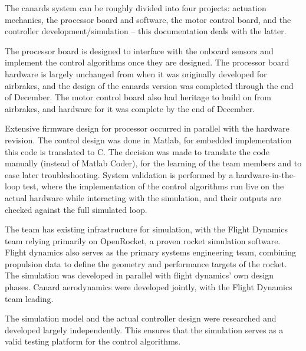 The canards system can be roughly divided into four projects: actuation mechanics, the processor board and software, the motor control board, and the controller development/simulation -- this documentation deals with the latter.

The processor board is designed to interface with the onboard sensors and implement the control algorithms once they are designed.
The processor board hardware is largely unchanged from when it was originally developed for airbrakes, and the design of the canards version was completed through the end of December. The motor control board also had heritage to build on from airbrakes, and hardware for it was complete by the end of December.

Extensive firmware design for processor occurred in parallel with the hardware revision. 
The control design was done in Matlab, for embedded implementation this code is translated to C.
The decision was made to translate the code manually (instead of Matlab Coder), for the learning of the team members and to ease later troubleshooting.
System validation is performed by a hardware-in-the-loop test, where the implementation of the control algorithms run live on the actual hardware while interacting with the simulation, and their outputs are checked against the full simulated loop.

The team has existing infrastructure for simulation, with the Flight Dynamics team relying primarily on OpenRocket, a proven rocket simulation software. 
Flight dynamics also serves as the primary systems engineering team, combining propulsion data to define the geometry and performance targets of the rocket. 
The simulation was developed in parallel with flight dynamics' own design phases.
Canard aerodynamics were developed jointly, with the Flight Dynamics team leading.

The simulation model and the actual controller design were researched and developed largely independently.
This ensures that the simulation serves as a valid testing platform for the control algorithms.

